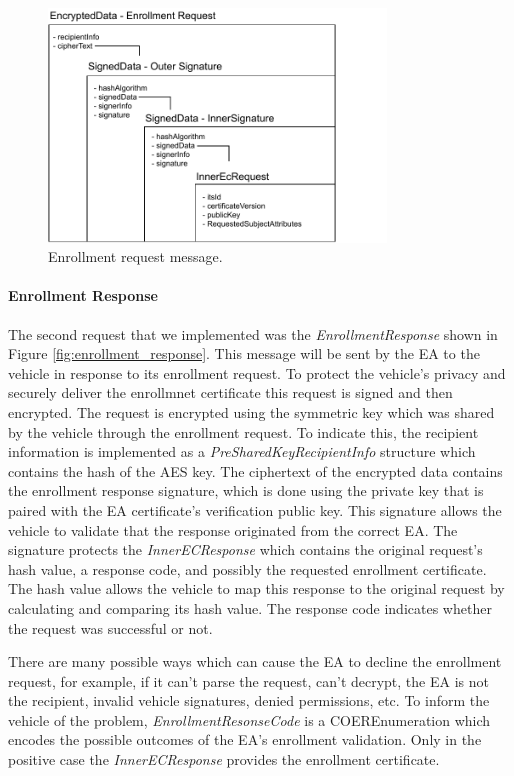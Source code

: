 \begin{figure}
	\centering
	\includegraphics[width=0.8\textwidth]{Figures/enrollmentrequest}
	\caption{\label{fig:enrollment_request}Enrollment request message.}
\end{figure}

\paragraph{Enrollment Response}
The second request that we implemented was the \textit{EnrollmentResponse} shown in Figure \ref{fig:enrollment_response}. This message will be sent by the EA to the vehicle in response to its enrollment request. To protect the vehicle's privacy and securely deliver the enrollmnet certificate this request is signed and then encrypted. The request is encrypted using the symmetric key which was shared by the vehicle through the enrollment request. To indicate this, the recipient information is implemented as a \textit{PreSharedKeyRecipientInfo} structure which contains the hash of the AES key. The ciphertext of the encrypted data contains the enrollment response signature, which is done using the private key that is paired with the EA certificate's verification public key. This signature allows the vehicle to validate that the response originated from the correct EA. The signature protects the \textit{InnerECResponse} which contains the original request's hash value, a response code, and possibly the requested enrollment certificate. The hash value allows the vehicle to map this response to the original request by calculating and comparing its hash value. The response code indicates whether the request was successful or not. 

There are many possible ways which can cause the EA to decline the enrollment request, for example, if it can't parse the request, can't decrypt, the EA is not the recipient, invalid vehicle signatures, denied permissions, etc. To inform the vehicle of the problem, \textit{EnrollmentResonseCode} is a COEREnumeration which encodes the possible outcomes of the EA's enrollment validation. Only in the positive case the \textit{InnerECResponse} provides the enrollment certificate. 

